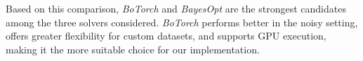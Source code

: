 \documentclass[pdflatex,sn-mathphys-num]{sn-jnl}%
\theoremstyle{thmstyleone}%
\theoremstyle{thmstyletwo}%
\theoremstyle{thmstylethree}%
\begin{document}
\begin{appendices}
Based on this comparison, \textit{BoTorch} and \textit{BayesOpt} are the strongest candidates among the three solvers considered. \textit{BoTorch} performs better in the noisy setting, offers greater flexibility for custom datasets, and supports GPU execution, making it the more suitable choice for our implementation.

\end{appendices}

\end{document}
